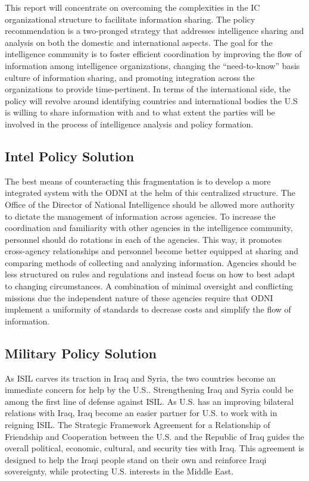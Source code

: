 \documentclass{report}
\begin{document}
This report will concentrate on overcoming the complexities in the IC organizational structure to facilitate information sharing. The policy recommendation is a two-pronged strategy that addresses intelligence sharing and analysis on both the domestic and international aspects. The goal for the intelligence community is to foster efficient coordination by improving the flow of information among intelligence organizations, changing the \enquote{need-to-know} basis culture of information sharing, and promoting integration across the organizations to provide time-pertinent. In terms of the international side, the policy will revolve around identifying countries and international bodies the U.S is willing to share information with and to what extent the parties will be involved in the process of intelligence analysis and policy formation.

\subsection{Intel Policy Solution}

The best means of counteracting this fragmentation is to develop a more integrated system with the ODNI at the helm of this  centralized structure. The Office of the Director of National Intelligence should be allowed more authority to dictate the management of information across agencies.  To increase the coordination and familiarity with other agencies in the intelligence community, personnel should do rotations in each of the agencies. This way, it promotes cross-agency relationships and personnel become better equipped at sharing and comparing methods of collecting and analyzing information.  Agencies should be less structured on rules and regulations and instead focus on how to best adapt to changing circumstances. A combination of minimal oversight and conflicting missions due the independent nature of these agencies \cite{Zegart2005} require that ODNI implement a uniformity of standards to decrease costs and simplify the flow of information. 

\subsection{Military Policy Solution}
 
As ISIL carves its traction in Iraq and Syria, the two countries become an immediate concern for help by the U.S.. Strengthening Iraq and Syria could be among the first line of defense against ISIL. As U.S. has an improving bilateral relations with Iraq, Iraq become an easier partner for U.S. to work with in reigning ISIL. The Strategic Framework Agreement for a Relationship of Friendship and Cooperation between the U.S. and the Republic of Iraq guides the overall political, economic, cultural, and security ties with Iraq.  This agreement is designed to help the Iraqi people stand on their own and reinforce Iraqi sovereignty, while protecting U.S. interests in the Middle East. 
\end{document}
